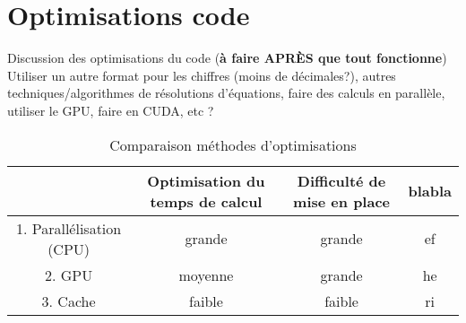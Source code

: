 \chapter{Optimisations code}
\label{chaper-5}

Discussion des optimisations du code (\textbf{à faire APRÈS que tout fonctionne})\\

Utiliser un autre format pour les chiffres (moins de décimales?), autres techniques/algorithmes de résolutions d'équations, faire des calculs en parallèle, utiliser le GPU, faire en CUDA, etc ?\\

\begin{table}[h]
    \centering
    \begin{tabular}{|c|c|c|c|}
        \hline
         & Optimisation du temps de calcul & Difficulté de mise en place & blabla\\
         \hline
         1. Parallélisation (CPU) & grande & grande & ef\\
         2. GPU & moyenne & grande & he\\
         3. Cache & faible & faible & ri\\
         \hline
    \end{tabular}
    \caption{Comparaison méthodes d'optimisations}
    \label{tab:optimisation-table}
\end{table}